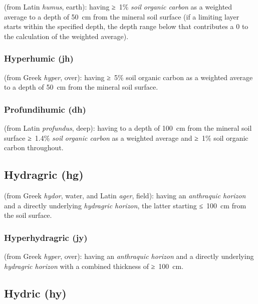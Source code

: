 \documentclass[
  letterpaper,
  DIV=11,
  numbers=noendperiod]{scrreprt}
\begin{document}
(from Latin \emph{humus}, earth): having ≥~1\% \emph{soil organic
carbon} as a weighted average to a depth of 50~cm from the mineral soil
surface (if a limiting layer starts within the specified depth, the
depth range below that contributes a 0 to the calculation of the
weighted average).

\hypertarget{hyperhumic-jh}{%
\subsubsection{Hyperhumic (jh)}\label{hyperhumic-jh}}

(from Greek \emph{hyper}, over): having ≥~5\% soil organic carbon as a
weighted average to a depth of 50~cm from the mineral soil surface.

\hypertarget{profundihumic-dh}{%
\subsubsection{Profundihumic (dh)}\label{profundihumic-dh}}

(from Latin \emph{profundus}, deep): having to a depth of 100~cm from
the mineral soil surface ≥~1.4\% \emph{soil organic carbon} as a
weighted average and ≥~1\% soil organic carbon throughout.

\hypertarget{hydragric-hg}{%
\subsection{Hydragric (hg)}\label{hydragric-hg}}

(from Greek \emph{hydor}, water, and Latin \emph{ager}, field): having
an \emph{anthraquic horizon} and a directly underlying \emph{hydragric
horizon}, the latter starting ≤~100~cm from the soil surface.

\hypertarget{hyperhydragric-jy}{%
\subsubsection{Hyperhydragric (jy)}\label{hyperhydragric-jy}}

(from Greek \emph{hyper}, over): having an \emph{anthraquic horizon} and
a directly underlying \emph{hydragric horizon} with a combined thickness
of ≥~100~cm.

\hypertarget{hydric-hy}{%
\subsection{Hydric (hy)}\label{hydric-hy}}
\end{document}
